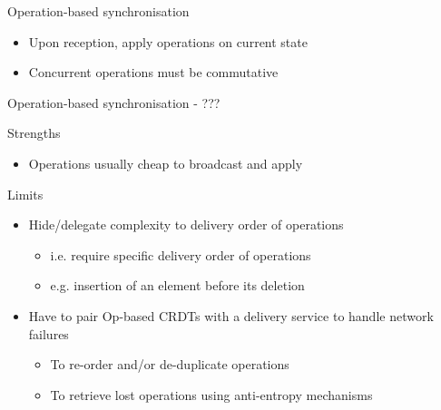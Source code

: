 \begin{frame}{Operation-based synchronisation}
\begin{figure}[!ht]
{
        }
      \end{figure}

    \begin{itemize}
        \item Upon reception, apply operations on current state
        \item \alert{Concurrent operations} must be \alert{commutative}
    \end{itemize}
\end{frame}

\begin{frame}{Operation-based synchronisation - ???}

    \begin{block}{Strengths}
        \begin{itemize}
            \item Operations usually cheap to broadcast and apply
        \end{itemize}
    \end{block}
    \begin{block}{Limits}
        \begin{itemize}
            \item Hide/delegate complexity to delivery order of operations
            \begin{itemize}
                \item i.e. require specific delivery order of operations
                \item e.g. insertion of an element before its deletion
            \end{itemize}
            \item Have to pair Op-based CRDTs with a delivery service to handle network failures
            \begin{itemize}
                \item To re-order and/or de-duplicate operations
                \item To retrieve lost operations using anti-entropy mechanisms
            \end{itemize}
        \end{itemize}
    \end{block}
\end{frame}

